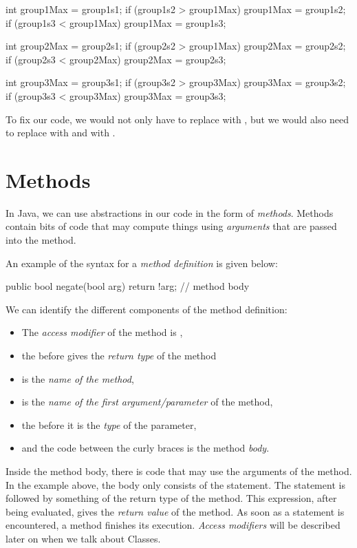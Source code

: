 \begin{code}
int group1Max = group1s1;
if (group1s2 > group1Max) {
  group1Max = group1s2;
}
if (group1s3 < group1Max) {
  group1Max = group1s3;
}

int group2Max = group2s1;
if (group2s2 > group1Max) {
  group2Max = group2s2;
}
if (group2s3 < group2Max) {
  group2Max = group2s3;
}

int group3Max = group3s1;
if (group3s2 > group3Max) {
  group3Max = group3s2;
}
if (group3s3 < group3Max) {
  group3Max = group3s3;
}
\end{code}

To fix our code, we would not only have to replace  with
, but we would also need to replace  with
 and  with .

\section{Methods}
In Java, we can use abstractions in our code in the form of \emph{methods}.
Methods contain bits of code that may compute things using \emph{arguments}
that are passed into the method.

An example of the syntax for a \emph{method definition} is given below:
\begin{code}
public bool negate(bool arg) {
  return !arg; // method body
}
\end{code}
We can identify the different components of the method definition:
\begin{itemize}
\item  The \emph{access modifier} of the method is ,
\item the  before  gives the \emph{return type} of the method
\item {} is the \emph{name of the method},
\item {} is the \emph{name of the first argument/parameter} of the method,
\item the  before  it is the \emph{type} of the  parameter,
\item and the code between the curly braces is the method \emph{body}.
\end{itemize}
Inside the method body, there is code that may use the arguments of the method.
In the example above, the body only consists of the  statement.
The  statement is followed by something of the return type of the method.
This expression, after being evaluated, gives the \emph{return value} of the method.
As soon as a  statement is encountered, a method finishes its execution.
\emph{Access modifiers} will be described later on when we talk about Classes.

